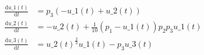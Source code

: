 \begin{align}
\frac{\mathrm{d} u\_{1}\left( t \right)}{\mathrm{d}t} &= p_{3} \left(  - u\_{1}\left( t \right) + u\_{2}\left( t \right) \right) \\
\frac{\mathrm{d} u\_{2}\left( t \right)}{\mathrm{d}t} &=  - u\_{2}\left( t \right) + \frac{1}{10} \left( p_{1} - u\_{1}\left( t \right) \right) p_{2} p_{3} u\_{1}\left( t \right) \\
\frac{\mathrm{d} u\_{3}\left( t \right)}{\mathrm{d}t} &= u\_{2}\left( t \right)^{\frac{2}{3}} u\_{1}\left( t \right) - p_{3} u\_{3}\left( t \right)
\end{align}
